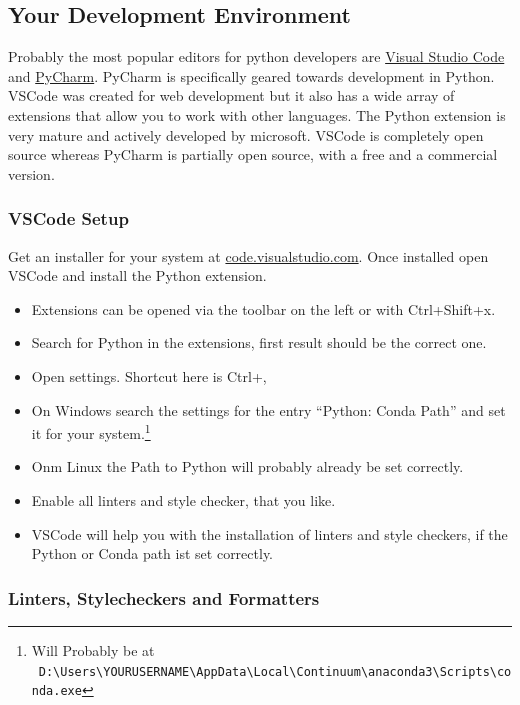 \documentclass{article}
\begin{document}
\subsection{Your Development Environment}

Probably the most popular editors for python developers are
\href{https://code.visualstudio.com/}{Visual Studio Code}
and \href{https://www.jetbrains.com/pycharm/}{PyCharm}.
PyCharm is specifically geared towards development in Python.
VSCode was created for web development but it also has a wide array of
extensions that allow you to work with other languages.
The Python extension is very mature and actively developed by microsoft.
VSCode is completely open source whereas PyCharm is partially open source, with
a free and a commercial version.

\subsubsection{VSCode Setup}

Get an installer for your system at
\href{https://code.visualstudio.com/}{code.visualstudio.com}.
Once installed open VSCode and install the Python extension.
\begin{itemize}
    \item Extensions can be opened via the toolbar on the left or with Ctrl+Shift+x.
    \item Search for Python in the extensions, first result should be the correct one.
    \item Open settings. Shortcut here is Ctrl+,
    \item On Windows search the settings for the entry
          ``Python: Conda Path'' and set it for your system.\footnote{Will Probably be at\\ \
              \verb!D:\Users\YOURUSERNAME\AppData\Local\Continuum\anaconda3\Scripts\conda.exe! }
    \item Onm Linux the Path to Python will probably already be set correctly.
    \item Enable all linters and style checker, that you like.
    \item VSCode will help you with the installation of linters and style checkers,
          if the Python or Conda path ist set correctly.
\end{itemize}

\subsubsection{Linters, Stylecheckers and Formatters}
\end{document}
